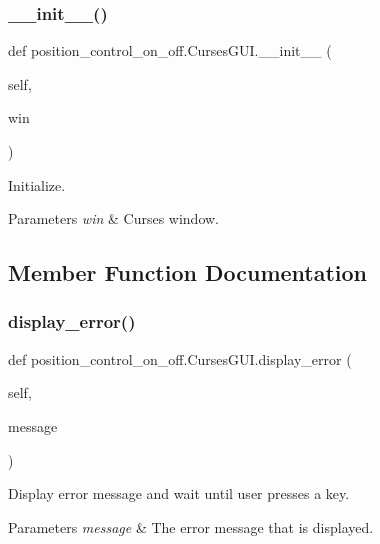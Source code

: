 \subsubsection{\texorpdfstring{\+\_\+\+\_\+init\+\_\+\+\_\+()}{\_\_init\_\_()}}
{\footnotesize\ttfamily def position\+\_\+control\+\_\+on\+\_\+off.\+Curses\+G\+U\+I.\+\_\+\+\_\+init\+\_\+\+\_\+ (\begin{DoxyParamCaption}\item[{}]{self,  }\item[{}]{win }\end{DoxyParamCaption})}



Initialize. 


\begin{DoxyParams}{Parameters}
{\em win} & Curses window. \\
\hline
\end{DoxyParams}


\subsection{Member Function Documentation}
\mbox{\label{classposition__control__on__off_1_1CursesGUI_ab72e206b4ef8403d82c8a2b21fd8fbaa}} 
\subsubsection{\texorpdfstring{display\+\_\+error()}{display\_error()}}
{\footnotesize\ttfamily def position\+\_\+control\+\_\+on\+\_\+off.\+Curses\+G\+U\+I.\+display\+\_\+error (\begin{DoxyParamCaption}\item[{}]{self,  }\item[{}]{message }\end{DoxyParamCaption})}



Display error message and wait until user presses a key. 


\begin{DoxyParams}{Parameters}
{\em message} & The error message that is displayed. \\
\hline
\end{DoxyParams}
\mbox{\label{classposition__control__on__off_1_1CursesGUI_a793199d55d5ea538b34ddaf6d00b0332}} 
